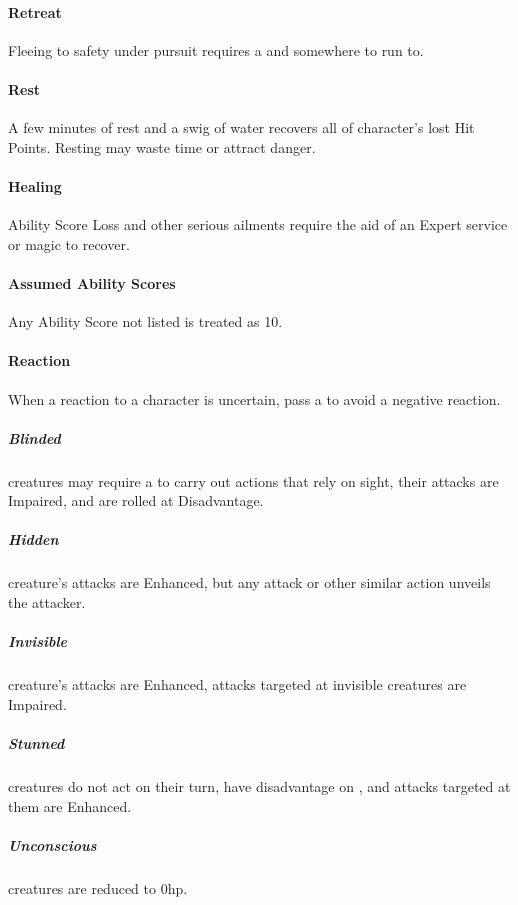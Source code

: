 \documentclass[itdr]{subfiles}
\begin{document}
\paragraph{Retreat}
Fleeing to safety under pursuit requires a  and somewhere to run to.

\paragraph{Rest}
A few minutes of rest and a swig of water recovers all of character's lost Hit Points. Resting may waste time or attract danger.

\paragraph{Healing}
Ability Score Loss and other serious ailments require the aid of an Expert service or magic to recover.

\paragraph{Assumed Ability Scores}
Any Ability Score not listed is treated as 10.

\paragraph{Reaction}
When a reaction to a character is uncertain, pass a  to avoid a negative reaction.


\subparagraph{Blinded} creatures may require a  to carry out actions that rely on sight, their attacks are Impaired, and  are rolled at Disadvantage.

\subparagraph{Hidden} creature's attacks are Enhanced, but any attack or other similar action unveils the attacker.

\subparagraph{Invisible} creature's attacks are Enhanced, attacks targeted at invisible creatures are Impaired.

\subparagraph{Stunned} creatures do not act on their turn, have disadvantage on , and attacks targeted at them are Enhanced.

\subparagraph{Unconscious} creatures are reduced to 0hp.
\end{document}
